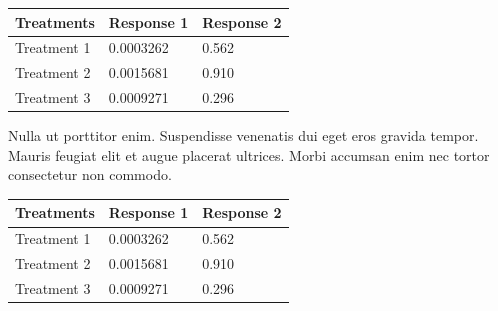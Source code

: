 \documentclass[landscape,a0paper,fontscale=0.285]{baposter} %
\begin{document}
\begin{poster}
{	\begin{center}
	\begin{tabular}{l l l}
	\toprule
	\textbf{Treatments} & \textbf{Response 1} & \textbf{Response 2}\\
	\midrule
	Treatment 1 & 0.0003262 & 0.562 \\
	Treatment 2 & 0.0015681 & 0.910 \\
	Treatment 3 & 0.0009271 & 0.296 \\
	\bottomrule
	\end{tabular}
	\end{center}

	Nulla ut porttitor enim. Suspendisse venenatis dui eget eros gravida tempor. Mauris feugiat elit et augue placerat ultrices. Morbi accumsan enim nec tortor consectetur non commodo.

	\begin{center}
	\begin{tabular}{l l l}
	\toprule
	\textbf{Treatments} & \textbf{Response 1} & \textbf{Response 2}\\
	\midrule
	Treatment 1 & 0.0003262 & 0.562 \\
	Treatment 2 & 0.0015681 & 0.910 \\
	Treatment 3 & 0.0009271 & 0.296 \\
	\bottomrule
	\end{tabular}
	\end{center}
	}


	\end{poster}

	
\end{document}
